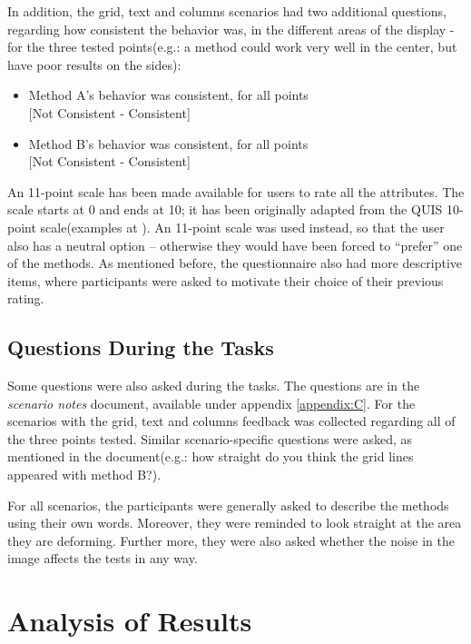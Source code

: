 \documentclass[]{article}
\begin{document}
In addition, the grid, text and columns scenarios had two additional questions, regarding how consistent the behavior was, in the different areas of the display - for the three tested points(e.g.: a method could work very well in the center, but have poor results on the sides):
\begin{itemize}
\item Method A's behavior was consistent, for all points \\{[Not Consistent - Consistent]}
\item Method B's behavior was consistent, for all points \\{[Not Consistent - Consistent]}
\end{itemize}

An 11-point scale has been made available for users to rate all the attributes. The scale starts at 0 and ends at 10; it has been originally adapted from the QUIS 10-point scale(examples at \cite{quis}). An 11-point scale was used instead, so that the user also has a neutral option – otherwise they would have been forced to “prefer” one of the methods. As mentioned before, the questionnaire also had more descriptive items, where participants were asked to motivate their choice of their previous rating.

\subsection{Questions During the Tasks}

Some questions were also asked during the tasks. The questions are in the \textit{scenario notes} document, available under appendix \ref{appendix:C}. For the scenarios with the grid, text and columns feedback was collected regarding all of the three points tested. Similar scenario-specific questions were asked, as mentioned in the document(e.g.: how straight do you think the grid lines appeared with method B?).

For all scenarios, the participants were generally asked to describe the methods using their own words. Moreover, they were reminded to look straight at the area they are deforming. Further more, they were also asked whether the noise in the image affects the tests in any way.

\newpage
\section{Analysis of Results}
\label{sec:Results}
\end{document}
